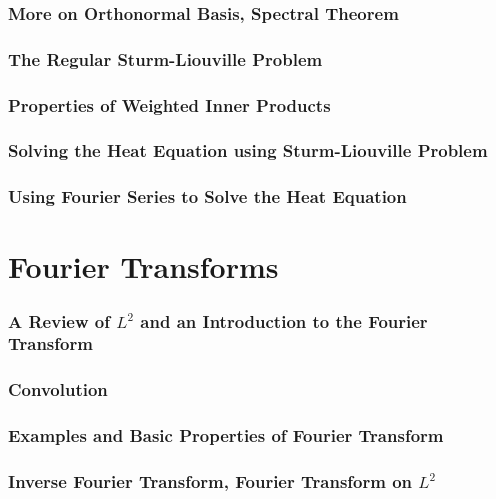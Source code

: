 \section{More on Orthonormal Basis, Spectral Theorem}

\section{The Regular Sturm-Liouville Problem}

\section{Properties of Weighted Inner Products}

\section{Solving the Heat Equation using Sturm-Liouville Problem}

\section{Using Fourier Series to Solve the Heat Equation}

\part{Fourier Transforms}
\section{A Review of $L^{2}$ and an Introduction to the Fourier Transform}

\section{Convolution}


\section{Examples and Basic Properties of Fourier Transform}

\section{Inverse Fourier Transform, Fourier Transform on $L^2$}


